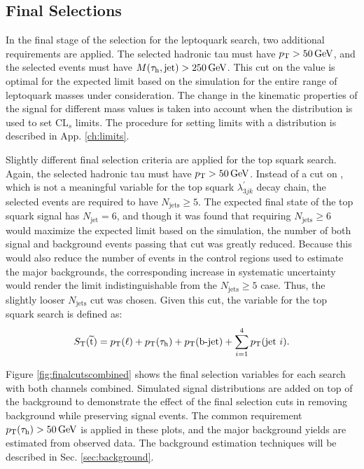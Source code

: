 
\subsection{Final Selections}

In the final stage of the selection for the leptoquark search, two additional requirements are applied. The selected hadronic tau must have $p_{\mathrm{T}}>50\,\text{Ge\hspace{-.08em}V}$, and the selected events must have $M(\tau_{\text{h}},\text{jet})>250\,\text{Ge\hspace{-.08em}V}$. This cut on the \MassTJ value is optimal for the expected limit based on the simulation for the entire range of leptoquark masses under consideration. The change in the kinematic properties of the signal for different mass values is taken into account when the \ST distribution is used to set $\text{CL}_{s}$ limits. The procedure for setting limits with a distribution is described in App. \ref{ch:limits}.

Slightly different final selection criteria are applied for the top squark search. Again, the selected hadronic tau must have $p_{\mathrm{T}}>50\,\text{Ge\hspace{-.08em}V}$. Instead of a cut on \MassTJ, which is not a meaningful variable for the top squark $\lambda^{\prime}_{3jk}$ decay chain, the selected events are required to have $N_{\text{jets}}\geq5$. The expected final state of the top squark signal has $N_{\text{jet}}=6$, and though it was found that requiring $N_{\text{jets}}\geq6$ would maximize the expected limit based on the simulation, the number of both signal and background events passing that cut was greatly reduced. Because this would also reduce the number of events in the control regions used to estimate the major backgrounds, the corresponding increase in systematic uncertainty would render the limit indistinguishable from the $N_{\text{jets}}\geq5$ case. Thus, the slightly looser $N_{\text{jets}}$ cut was chosen. Given this cut, the \ST variable for the top squark search is defined as:
\begin{equation}
\label{eq:STstop}
S_{\text{T}}(\widetilde{\mathrm{t}}) = p_{\mathrm{T}}(\ell) + p_{\mathrm{T}}(\tau_{\text{h}}) + p_{\mathrm{T}}(\text{b-jet}) + \sum_{i=1}^{4}p_{\mathrm{T}}(\text{jet }i).
\end{equation}

Figure \ref{fig:finalcutscombined} shows the final selection variables for each search with both channels combined. Simulated signal distributions are added on top of the background to demonstrate the effect of the final selection cuts in removing background while preserving signal events. The common requirement $p_{\mathrm{T}}(\tau_{\text{h}})>50\,\text{Ge\hspace{-.08em}V}$ is applied in these plots, and the major background yields are estimated from observed data. The background estimation techniques will be described in Sec. \ref{sec:background}.


